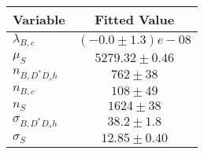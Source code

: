 \begin{tabular}[t]{lc}
\hline
Variable &Fitted Value\\
\hline\hline
$\lambda_{B,c}$&$(-0.0\pm1.3)e-08$\\
\hline
$\mu_S$&$5279.32\pm0.46$\\
\hline
$n_{B, D^* D_s h}$&$762\pm38$\\
\hline
$n_{B,c}$&$108\pm49$\\
\hline
$n_S$&$1624\pm38$\\
\hline
$\sigma_{B, D^* D_s h}$&$38.2\pm1.8$\\
\hline
$\sigma_S$&$12.85\pm0.40$\\
\hline
\end{tabular}